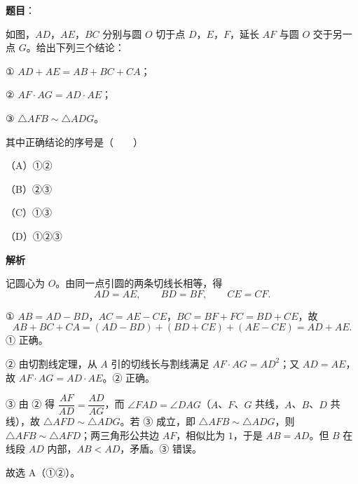 \begin{answer}

\textbf{题目}：

如图，$AD$，$AE$，$BC$ 分别与圆 $O$ 切于点 $D$，$E$，$F$，延长 $AF$ 与圆 $O$ 交于另一点 $G$。给出下列三个结论：

① $AD+AE=AB+BC+CA$；

② $AF\cdot AG=AD\cdot AE$；

③ $\triangle AFB\sim\triangle ADG$。

其中正确结论的序号是\mbox{（　　）}

（A）①②

（B）②③

（C）①③

（D）①②③
\nopagebreak[4]
\begin{center}\end{center}
\nopagebreak[4]
\textbf{解析}

记圆心为 $O$。由同一点引圆的两条切线长相等，得
\nopagebreak[4]
\[
AD=AE,\qquad BD=BF,\qquad CE=CF.
\]

① $AB=AD-BD$，$AC=AE-CE$，$BC=BF+FC=BD+CE$，故
\nopagebreak[4]
\[
AB+BC+CA=(AD-BD)+(BD+CE)+(AE-CE)=AD+AE.
\]
① 正确。

② 由切割线定理，从 $A$ 引的切线长与割线满足 $AF\cdot AG=AD^2$；又 $AD=AE$，故 $AF\cdot AG=AD\cdot AE$。② 正确。

③ 由 ② 得 $\dfrac{AF}{AD}=\dfrac{AD}{AG}$，而 $\angle FAD=\angle DAG$（$A$、$F$、$G$ 共线，$A$、$B$、$D$ 共线），故 $\triangle AFD\sim\triangle ADG$。若 ③ 成立，即 $\triangle AFB\sim\triangle ADG$，则 $\triangle AFB\sim\triangle AFD$；两三角形公共边 $AF$，相似比为 $1$，于是 $AB=AD$。但 $B$ 在线段 $AD$ 内部，$AB<AD$，矛盾。③ 错误。

故选 A（①②）。


\end{answer}
